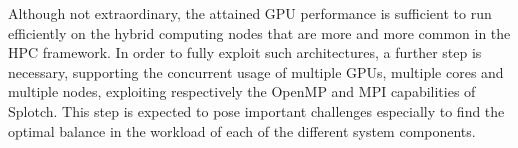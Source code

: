 \documentclass[11pt]{article}
\begin{document}
Although not extraordinary, the attained GPU performance is sufficient 
to run efficiently on the hybrid computing nodes that are more and 
more common in the HPC framework. In order to fully exploit such architectures, 
a further step is necessary, supporting the concurrent usage of 
multiple GPUs, multiple cores and multiple nodes, exploiting respectively the OpenMP and
MPI capabilities of Splotch. This step is expected to pose important 
challenges especially to find the optimal balance in the workload of each of the different 
system components.


	
\end{document}
